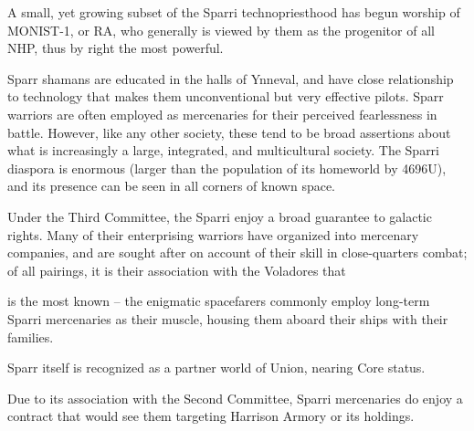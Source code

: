 A small, yet growing subset of the Sparri technopriesthood has begun worship of MONIST-1, or  
RA, who generally is viewed by them as the progenitor of all NHP, thus by right the most powerful.    

Sparr shamans are educated in the halls of Ynneval, and have close relationship to technology  
that makes them unconventional but very effective pilots. Sparr warriors are often employed as  
mercenaries for their perceived fearlessness in battle. However, like any other society, these tend  
to be broad assertions about what is increasingly a large, integrated, and multicultural society.  
The Sparri diaspora is enormous (larger than the population of its homeworld by 4696U), and its  
presence can be seen in all corners of known space.   

Under the Third Committee, the Sparri enjoy a broad guarantee to galactic rights. Many of their  
enterprising warriors have organized into mercenary companies, and are sought after on account  
of their skill in close-quarters combat; of all pairings, it is their association with the Voladores that  

                                                                                                          


is the most known -- the enigmatic spacefarers commonly employ long-term Sparri mercenaries  
as their muscle, housing them aboard their ships with their families.   

Sparr itself is recognized as a partner world of Union, nearing Core status.   

Due to its association with the Second Committee, Sparri mercenaries do enjoy a contract that  
would see them targeting Harrison Armory or its holdings. 
 

      